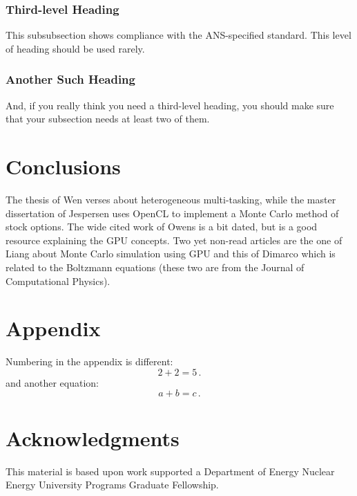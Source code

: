 \documentclass[twoside,a4paper,12pt,english,draft]{anstrans}
\begin{document}
\subsubsection{Third-level Heading}
This subsubsection shows compliance with the ANS-specified standard. This level
of heading should be used rarely.

\subsubsection{Another Such Heading}
And, if you really think you need a third-level heading, you should make sure
that your subsection needs at least two of them.

\section{Conclusions}

The thesis of Wen \cite{Wen2017} verses about heterogeneous multi-tasking, while
the master dissertation of Jespersen \cite{Jespersen2015} uses OpenCL to implement
a Monte Carlo method of stock options. The wide cited work of Owens \cite{Owens2007}
is a bit dated, but is a good resource explaining the GPU concepts. Two yet non-read articles
are the one of Liang \cite{Liang2017} about Monte Carlo simulation using GPU and this of Dimarco
\cite{Dimarco2017} which is related to the Boltzmann equations (these two are from the Journal
of Computational Physics).

\appendix
\section{Appendix}

Numbering in the appendix is different:
\begin{equation} \label{eq:appendix}
  2 + 2 = 5\,.
\end{equation}
and another equation:
\begin{equation} \label{eq:appendix2}
  a + b = c\,.
\end{equation}

\section{Acknowledgments}
This material is based upon work supported a Department of Energy Nuclear
Energy University Programs Graduate Fellowship.
\end{document}
